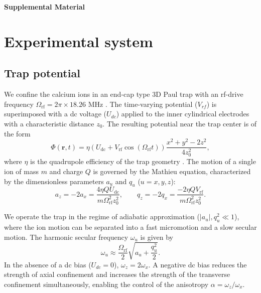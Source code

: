 \documentclass[aps,prl,twocolumn,superscriptaddress,showpacs,floatfix]{revtex4-2}
\begin{document}
\onecolumngrid
\clearpage

\begingroup

\setcounter{figure}{0}
\setcounter{section}{0}

\renewcommand{\thefigure}{SF\arabic{figure}}
\renewcommand{\theHfigure}{SF\arabic{figure}}

\setcounter{equation}{0}
\renewcommand{\theequation}{SE\arabic{equation}}
\renewcommand{\theHequation}{SE\arabic{equation}}

\setcounter{page}{1}
\renewcommand{\thepage}{S\arabic{page}}

\begin{center}
{\LARGE{\textbf{Supplemental Material}}}
\end{center}

\section{Experimental system}

\subsection{Trap potential}

We confine the calcium ions in an end-cap type 3D Paul trap  \cite{schrama_novel_1993} with an rf-drive frequency $\Omega_{\text{rf}} = 2\pi \times 18.26$ MHz \cite{ayyadevara2025}. The time-varying potential ($V_{rf}$) is superimposed with a dc voltage ($U_{dc}$) applied to the inner cylindrical electrodes with a characteristic distance $z_0$. The resulting potential near the trap center is of the form
\begin{equation}
    \Phi(\mathbf{r}, t) = \eta (U_{\text{dc}} + V_{\text{rf}} \cos(\Omega_{\text{rf}} t)) \frac{x^2 + y^2 - 2z^2}{4z_0^2},
\end{equation}
where $\eta$ is the quadrupole efficiency of the trap geometry \cite{schrama_novel_1993}. The motion of a single ion of mass $m$ and charge $Q$ is governed by the Mathieu equation, characterized by the dimensionless parameters $a_u$ and $q_u$ ($u=x,y,z$):
\begin{equation}
    a_z = -2a_x = \frac{4 \eta Q U_{\text{dc}}}{m \Omega_{\text{rf}}^2 z_0^2}, \quad \quad q_z = -2q_x = \frac{-2 \eta Q V_{\text{rf}}}{m \Omega_{\text{rf}}^2 z_0^2}. \label{eq:az_qz}
\end{equation}

We operate the trap in the regime of adiabatic approximation ($|a_u|, q_u^2 \ll 1$), where the ion motion can be separated into a fast micromotion and a slow secular motion. The harmonic secular frequency $\omega_u$ is given by
\begin{equation}
    \omega_u \approx \frac{\Omega_{\text{rf}}}{2} \sqrt{a_u + \frac{q_u^2}{2}}.
\end{equation}
In the absence of a dc bias ($U_{dc}=0$), $\omega_z=2\omega_x$. A negative dc bias reduces the strength of axial confinement and increases the strength of the transverse confinement simultaneously, enabling the control of the anisotropy $\alpha = \omega_z / \omega_x$.
\end{document}
